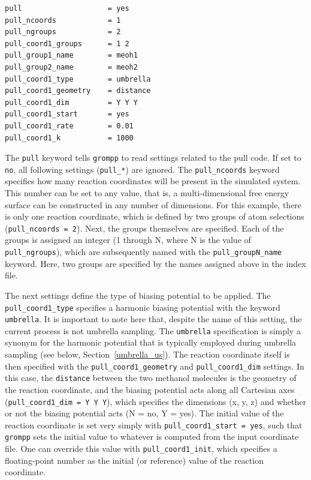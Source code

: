 \documentclass[9pt,tutorial,pubversion]{livecoms}
\begin{document}
\begin{lstlisting}
pull                    = yes
pull_ncoords            = 1
pull_ngroups            = 2
pull_coord1_groups      = 1 2
pull_group1_name        = meoh1
pull_group2_name        = meoh2
pull_coord1_type        = umbrella
pull_coord1_geometry    = distance
pull_coord1_dim         = Y Y Y
pull_coord1_start       = yes
pull_coord1_rate        = 0.01
pull_coord1_k           = 1000
\end{lstlisting}


The \texttt{pull} keyword tells \texttt{grompp} to read settings related to the pull code. If set to \texttt{no}, all following settings (\texttt{pull\_*}) are ignored. The \texttt{pull\_ncoords} keyword specifies how many reaction coordinates will be present in the simulated system. This number can be set to any value, that is, a multi-dimensional free energy surface can be constructed in any number of dimensions. For this example, there is only one reaction coordinate, which is defined by two groups of atom selections (\texttt{pull\_ncoords = 2}). Next, the groups themselves are specified. Each of the groups is assigned an integer (1 through N, where N is the value of \texttt{pull\_ngroups}), which are subsequently named with the \texttt{pull\_groupN\_name} keyword. Here, two groups are specified by the names assigned above in the index file.

The next settings define the type of biasing potential to be applied. The \texttt{pull\_coord1\_type} specifies a harmonic biasing potential with the keyword \texttt{umbrella}. It is important to note here that, despite the name of this setting, the current process is not umbrella sampling. The \texttt{umbrella} specification is simply a synonym for the harmonic potential that is typically employed during umbrella sampling (see below, Section~\ref{umbrella_us}). The reaction coordinate itself is then specified with the \texttt{pull\_coord1\_geometry} and \texttt{pull\_coord1\_dim} settings. In this case, the \texttt{distance} between the two methanol molecules is the geometry of the reaction coordinate, and the biasing potential acts along all Cartesian axes (\texttt{pull\_coord1\_dim = Y Y Y}), which specifies the dimensions (x, y, z) and whether or not the biasing potential acts (N = no, Y = yes). The initial value of the reaction coordinate is set very simply with \texttt{pull\_coord1\_start = yes}, such that \texttt{grompp} sets the initial value to whatever is computed from the input coordinate file. One can override this value with \texttt{pull\_coord1\_init}, which specifies a floating-point number as the initial (or reference) value of the reaction coordinate.
\end{document}
